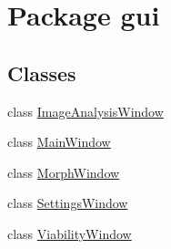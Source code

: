 \hypertarget{namespacegui}{}\section{Package gui}
\label{namespacegui}
\subsection*{Classes}
\begin{DoxyCompactItemize}
\item 
class \hyperlink{classgui_1_1_image_analysis_window}{Image\+Analysis\+Window}
\item 
class \hyperlink{classgui_1_1_main_window}{Main\+Window}
\item 
class \hyperlink{classgui_1_1_morph_window}{Morph\+Window}
\item 
class \hyperlink{classgui_1_1_settings_window}{Settings\+Window}
\item 
class \hyperlink{classgui_1_1_viability_window}{Viability\+Window}
\end{DoxyCompactItemize}

